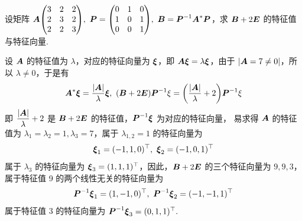 \begin{example}
    设矩阵 $\vb*{A}\mqty(3&2&2\\2&3&2\\2&2&3),~\vb*{P}=\mqty(0&1&0\\1&0&1\\0&0&1),~\vb*{B}=\vb*{P}^{-1}\vb*{A}^*\vb*{P}$，求 $\vb*{B}+2\vb*{E}$ 的特征值与特征向量.
\end{example}
\begin{solution}
    设 $\vb*{A}$ 的特征值为 $\lambda$，对应的特征向量为 $\vb*{\xi}$，即 $\vb*{A\xi}=\lambda\vb*{\xi}$，由于 $|\vb*{A}=7\neq0|$，所以 $\lambda\neq0$，于是有 
    $$\vb*{A}^*\vb*{\xi}=\dfrac{|\vb*{A}|}{\lambda}\vb*{\xi},~(\vb*{B}+2\vb*{E})\vb*{P}^{-1}\xi=\qty(\dfrac{|\vb*{A}|}{\lambda}+2)\vb*{P}^{-1}\xi$$
    即 $\dfrac{|\vb*{A}|}{\lambda}+2$ 是 $\vb*{B}+2\vb*{E}$ 的特征值，$\vb*{P}^{-1}\vb*{\xi}$ 为对应的特征向量，
    易求得 $\vb*{A}$ 的特征值为 $\lambda_1=\lambda_2=1,\lambda_3=7$，属于 $\lambda_{1,2}=1$ 的特征向量为 
    $$\vb*{\xi}_1=(-1,1,0)^\top,~\vb*{\xi}_2=(-1,0,1)^\top$$
    属于 $\lambda_3$ 的特征向量为 $\vb*{\xi}_3=(1,1,1)^\top$，因此，$\vb*{B}+2\vb*{E}$ 的三个特征向量为 $9,9,3$，属于特征值 9 的两个线性无关的特征向量为 
    $$\vb*{P}^{-1}\vb*{\xi}_1=(1,-1,0)^\top,~\vb*{P}^{-1}\vb*{\xi}_2=(-1,-1,1)^\top$$
    属于特征值 3 的特征向量为 $\vb*{P}^{-1}\vb*{\xi}_3=(0,1,1)^\top.$
\end{solution}

